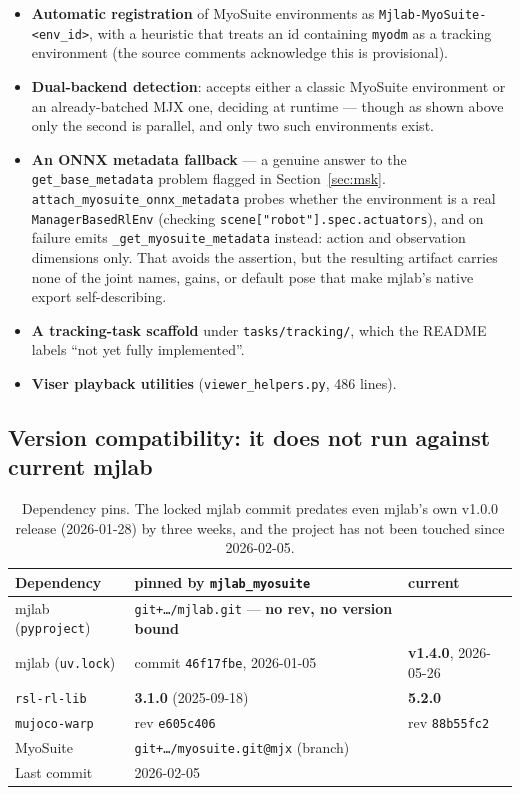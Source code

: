 \documentclass[11pt,a4paper]{article}
\newcommand{\na}{\textemdash}
\begin{document}
\begin{itemize}[leftmargin=1.4em,itemsep=0.25em]
\item \textbf{Automatic registration} of MyoSuite environments as
\texttt{Mjlab-MyoSuite-<env\_id>}, with a heuristic that treats an id containing
\texttt{myodm} as a tracking environment (the source comments acknowledge this is
provisional).
\item \textbf{Dual-backend detection}: accepts either a classic MyoSuite environment or an
already-batched MJX one, deciding at runtime --- though as shown above only the second is
parallel, and only two such environments exist.
\item \textbf{An ONNX metadata fallback} --- a genuine answer to the
\texttt{get\_base\_metadata} problem flagged in Section~\ref{sec:msk}.
\texttt{attach\_myosuite\_onnx\_metadata} probes whether the environment is a real
\texttt{ManagerBasedRlEnv} (checking \texttt{scene["robot"].spec.actuators}), and on
failure emits \texttt{\_get\_myosuite\_metadata} instead: action and observation
dimensions only. That avoids the assertion, but the resulting artifact carries none of
the joint names, gains, or default pose that make mjlab's native export self-describing.
\item \textbf{A tracking-task scaffold} under \texttt{tasks/tracking/}, which the README
labels ``not yet fully implemented''.
\item \textbf{Viser playback utilities} (\texttt{viewer\_helpers.py}, 486 lines).
\end{itemize}

\subsection{Version compatibility: it does not run against current mjlab}

\begin{table}[h!]
\centering
\small
\begin{tabular}{@{}lL{4.0cm}L{4.0cm}@{}}
\toprule
Dependency & pinned by \texttt{mjlab\_myosuite} & current \\
\midrule
mjlab (\texttt{pyproject}) & \texttt{git+\ldots/mjlab.git} --- \textbf{no rev, no version bound} & \na \\
mjlab (\texttt{uv.lock})   & commit \texttt{46f17fbe}, 2026-01-05 & \textbf{v1.4.0}, 2026-05-26 \\
\texttt{rsl-rl-lib}        & \textbf{3.1.0} (2025-09-18) & \textbf{5.2.0} \\
\texttt{mujoco-warp}       & rev \texttt{e605c406} & rev \texttt{88b55fc2} \\
MyoSuite                   & \texttt{git+\ldots/myosuite.git@mjx} (branch) & \na \\
Last commit                & 2026-02-05 & \na \\
\bottomrule
\end{tabular}
\caption{Dependency pins. The locked mjlab commit predates even mjlab's own v1.0.0 release
(2026-01-28) by three weeks, and the project has not been touched since 2026-02-05.}
\end{table}
\end{document}
